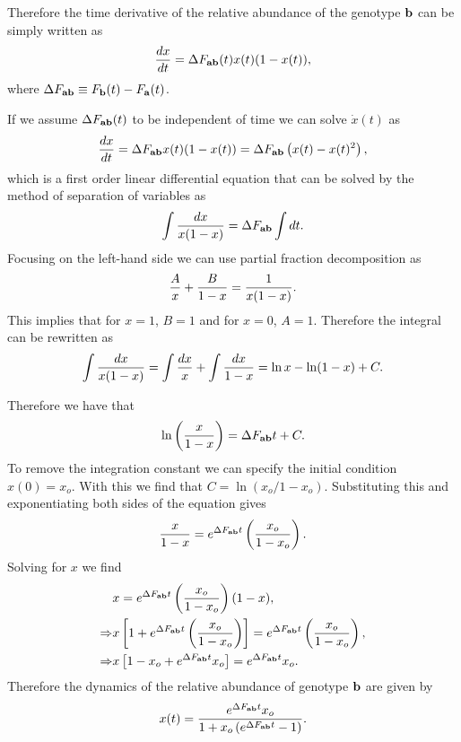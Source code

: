 Therefore the time derivative of the relative abundance of the genotype $\mathbf{b}$
can be simply written as
\begin{equation}
  {d{x} \over dt} = \Delta F_{\mathbf{ab}}(t) x(t) (1 - x(t)),
\end{equation}
where $\Delta F_{\mathbf{ab}} \equiv F_{\mathbf{b}}(t) - F_{\mathbf{a}}(t)$.

If we assume $\Delta F_{\mathbf{ab}}(t)$ to be independent of time we can solve $\dot x(t)$ as
\begin{equation}
  {d{x} \over dt} = \Delta F_{\mathbf{ab}} x(t) (1 - x(t)) = \Delta F_{\mathbf{ab}} \left( x(t) - x(t)^2 \right),
\end{equation}
which is a first order linear differential equation that can be solved by the
method of separation of variables as
\begin{equation}
  \int {dx \over x (1 - x)} = \Delta F_{\mathbf{ab}} \int dt.
\end{equation}
Focusing on the left-hand side we can use partial fraction decomposition as
\begin{equation}
  {A \over x} + {B \over 1 - x} = {1 \over x (1 - x)}.
\end{equation}
This implies that for $x = 1$, $B = 1$ and for $x = 0$, $A = 1$. Therefore the
integral can be rewritten as
\begin{equation}
  \int {dx \over x (1 - x)} = \int {dx \over x} + \int {dx \over 1 - x}
  = \ln x - \ln (1 - x) + C.
\end{equation}

Therefore we have that
\begin{equation}
  \ln \left( {x \over 1 - x} \right) = \Delta F_{\mathbf{ab}} t + C.
\end{equation}
To remove the integration constant we can specify the initial condition
$x(0) = x_o$. With this we find that $C = \ln (x_o / 1 - x_o)$. Substituting
this and exponentiating both sides of the equation gives
\begin{equation}
  {x \over 1 - x} = e^{\Delta F_{\mathbf{ab}} t} \left( {x_o \over 1 - x_o } \right).
\end{equation}
Solving for $x$ we find
\begin{align}
  &x = e^{\Delta F_{\mathbf{ab}} t} \left( {x_o} \over 1 - x_o \right)(1 - x),\\
  \Rightarrow &x \left[ 1 + e^{\Delta F_{\mathbf{ab}} t} \left( {x_o} \over 1 - x_o \right) \right]
  = e^{\Delta F_{\mathbf{ab}} t} \left( {x_o \over 1 - x_o} \right),\\
  \Rightarrow &x \left[ 1 - x_o + e^{\Delta F_{\mathbf{ab}} t} x_o \right] = e^{\Delta F_{\mathbf{ab}} t} x_o.
\end{align}
Therefore the dynamics of the relative abundance of genotype $\mathbf{b}$ are given
by
\begin{equation}
  x(t) = {e^{\Delta F_{\mathbf{ab}} t} x_o \over 1 + x_o \left( e^{\Delta F_{\mathbf{ab}} t} - 1 \right)}.
\end{equation}

